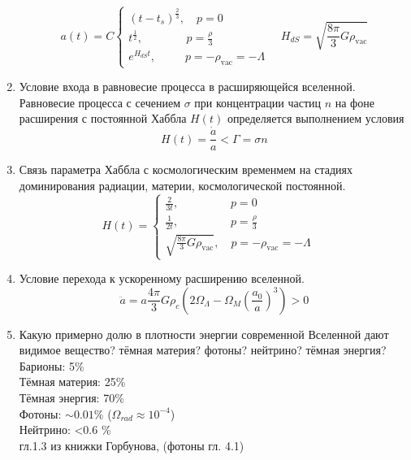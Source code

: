 \documentclass[12pt]{article}
\theoremstyle{definition}
\begin{document}
\begin{enumerate}
    \begin{equation}
    a(t)=C\begin{cases}
            (t-t_s)^\frac{2}{3},\quad p=0\\
            t^\frac{1}{2},\quad\quad\quad\;\;\; p=\frac{\rho}{3}\\
            e^{H_{dS}t},\quad\quad\;\; p=-\rho_\text{vac}=-\Lambda
        \end{cases}\quad H_{dS}=\sqrt{\frac{8\pi}{3}G\rho_\text{vac}}
    \end{equation}
    \item Условие входа в равновесие процесса в расширяющейся вселенной.\\
    Равновесие процесса с сечением $\sigma$ при концентрации частиц $n$ на фоне расширения с постоянной Хаббла $H(t)$ определяется выполнением условия
    \begin{equation}
        H(t)=\frac{\dot{a}}{a}<\Gamma=\sigma n
    \end{equation}
    \item Связь параметра Хаббла с космологическим временмем на стадиях доминирования радиации, материи, космологической постоянной.
     \begin{equation}
    H(t)=\begin{cases}
            \frac{2}{3t},\quad\quad\quad\quad\;\; p=0\\
            \frac{1}{2t},\quad\quad\quad\quad\;\; p=\frac{\rho}{3}\\
            \sqrt{\frac{8\pi}{3}G\rho_\text{vac}},\quad p=-\rho_\text{vac}=-\Lambda
        \end{cases}\quad 
    \end{equation}
   \item Условие перехода к ускоренному расширению вселенной.
   \begin{equation}
       \ddot{a}=a \frac{4\pi}{3}G \rho_c\left(2\Omega_{\Lambda}- \Omega_M\left(\frac{a_0}{a}\right)^3\right)>0
   \end{equation}
    \item Какую примерно долю в плотности энергии современной Вселенной дают видимое вещество? тёмная материя? фотоны? нейтрино? тёмная энергия?\\
    Барионы: 5\% \\
    Тёмная материя: 25\% \\
    Тёмная энергия: 70\% \\
    Фотоны: $\sim 0.01\%$ ($\Omega_{rad} \approx 10^{-4}$)\\
    Нейтрино: <0.6 \% \\
    гл.1.3 из книжки Горбунова, (фотоны гл. 4.1)
    

\end{enumerate}
\end{document}
